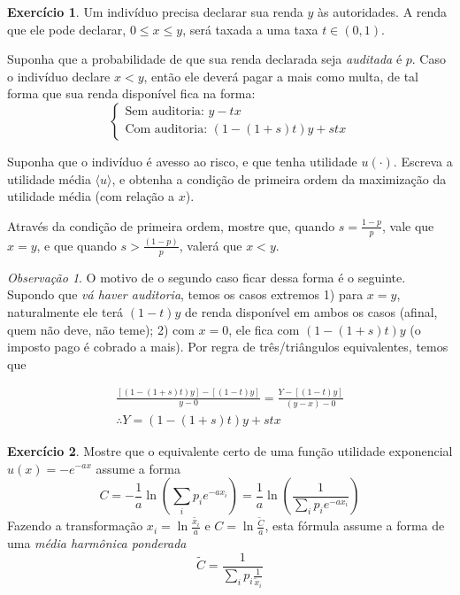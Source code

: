 \documentclass[12pt]{article}
\numberwithin{equation}{section}
\theoremstyle{plain}
\theoremstyle{definition}
\newtheorem{exercise}{Exercício}[section]
\theoremstyle{remark}
\newtheorem*{remark}{Observação}
\begin{document}
\begin{exercise}
\parencite[, pp. 223-4]{Cowell2004} Um indivíduo precisa declarar sua
renda \(y\) às autoridades. A renda que ele pode declarar,
\(0 \leq x \leq y\), será taxada a uma taxa \(t \in (0,1)\).

Suponha que a probabilidade de que sua renda declarada seja
\textit{auditada} é \(p\). Caso o indivíduo declare \(x < y\), então ele
deverá pagar a mais como multa, de tal forma que sua renda disponível
fica na forma:
\[
\begin{cases}
\text{Sem auditoria: } y - tx \\
\text{Com auditoria: } (1-(1+s)t)y + stx 
\end{cases}
\]

Suponha que o indivíduo é avesso ao risco, e que tenha utilidade
\(u(\cdot)\). Escreva a utilidade média \(\langle u \rangle\), e obtenha
a condição de primeira ordem da maximização da utilidade média (com
relação a \(x\)).

Através da condição de primeira ordem, mostre que, quando
\(s=\frac{1-p}{p}\), vale que \(x=y\), e que quando
\(s>\frac{(1-p)}{p}\), valerá que \(x < y\).

\begin{remark}
O motivo de o segundo caso ficar dessa forma é o seguinte. Supondo que
\textit{vá haver auditoria}, temos os casos extremos 1) para \(x=y\),
naturalmente ele terá \((1-t)y\) de renda disponível em ambos os casos
(afinal, quem não deve, não teme); 2) com \(x=0\), ele fica com
\((1 - (1+s)t)y\) (o imposto pago é cobrado a mais). Por regra de
três/triângulos equivalentes, temos que

\begin{align*}
\frac{[(1-(1+s)t)y] - [(1-t)y]}{y - 0} = \frac{Y - [(1-t)y]}{(y - x) - 0} \\
\therefore Y = (1-(1+s)t)y + stx
\end{align*}
\end{remark}
\end{exercise}

\begin{exercise}
Mostre que o equivalente certo de uma função utilidade exponencial
\(u(x) = - e^{-ax}\) assume a forma
\[
C = - \frac{1}{a} \ln\left( \sum \limits_{i}p_{i}e^{-ax_{i}} \right) = \frac{1}{a} \ln\left( \frac{1}{\sum \limits_{i}p_{i}e^{-ax_{i}}} \right)
\]
Fazendo a transformação \(x_i = \ln \frac{\tilde{x_{i}}}{a}\) e
\(C = \ln \frac{\tilde{C}}{a}\), esta fórmula assume a forma de uma
\textit{média harmônica ponderada}
\[
\tilde{C} = \frac{1}{\sum \limits_{i} p_{i} \frac{1}{\tilde{x}_{i}}} 
\]

\end{exercise}
\end{document}

